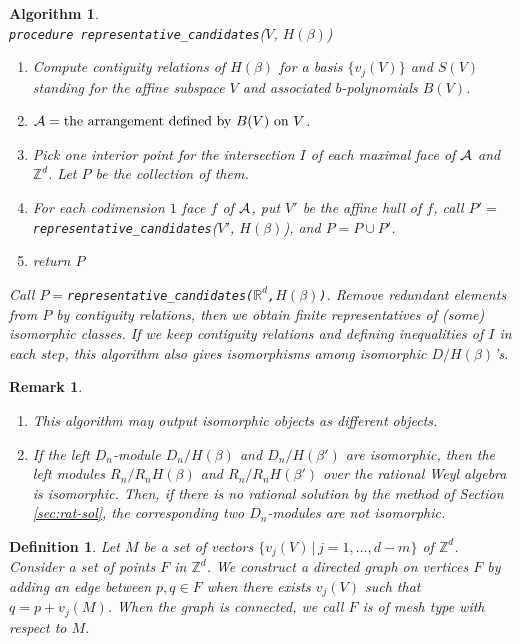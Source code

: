 \documentclass{article}
\def\RR{\mathbb{R}}
\def\ZZ{\mathbb{Z}}
\newtheorem{definition}{Definition}
\newtheorem{algorithm}{Algorithm}
\newtheorem{remark}{Remark}
\begin{document}
\begin{algorithm} \label{alg:representative} \rm \ \\
{\tt procedure representative\_candidates}($V$, $H(\beta)$)
\begin{enumerate}
\item Compute contiguity relations of $H(\beta)$ for a basis $\{v_j(V)\}$ and $S(V)$ standing for
the affine subspace $V$ and associated $b$-polynomials $B(V)$.
\item ${\cal A} = \mbox{the arrangement defined by $B(V)$ on $V$}$.
\item Pick one interior point for the intersection $I$ of each maximal face of ${\cal A}$ and $\ZZ^d$. Let $P$ be the collection of them.
\item For each codimension $1$ face $f$ of ${\cal A}$,
    put $V'$ be the affine hull of $f$, call $P'=${\tt representative\_candidates}($V'$, $H(\beta)$), and  $P = P \cup P'$.
\item return $P$
\end{enumerate}
Call 
$P=${\tt representative\_candidates($\RR^d$,$H(\beta)$)}.
Remove redundant elements from $P$ by contiguity relations, 
then we obtain finite representatives of (some) isomorphic classes.
If we keep contiguity relations and defining inequalities of $I$
in each step,
this algorithm also gives isomorphisms among isomorphic $D/H(\beta)$'s.
\end{algorithm}

\begin{remark}\rm
\begin{enumerate}
\item This algorithm may output isomorphic objects as different objects.
\item If the left $D_n$-module $D_n/H(\beta)$ and $D_n/H(\beta')$ are isomorphic,
then the left modules $R_n/R_nH(\beta)$ and $R_n/R_nH(\beta')$ over the rational
Weyl algebra is isomorphic.
Then, if there is no rational solution by the method of Section \ref{sec:rat-sol}, the corresponding two $D_n$-modules are not isomorphic.
\end{enumerate}
\end{remark}

\begin{definition}\rm
Let $M$ be a set of vectors $\{v_j(V)\,|\, j=1, \ldots, d-m\}$ of $\ZZ^d$.
Consider a set of points $F$ in $\ZZ^d$.
We construct a directed graph on vertices $F$ by adding an edge
between $p,q \in F$ when there exists $v_j(V)$ such that
$q=p+v_j(M)$.
When the graph is connected, we call $F$ is of {\it mesh type} with respect to $M$.
\end{definition}
\end{document}
